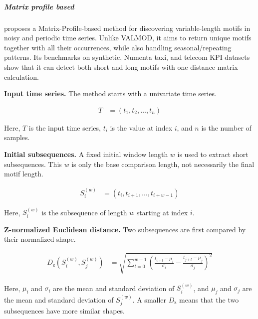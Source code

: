 \documentclass{book}
\begin{document}
\subparagraph{Matrix profile based}


\cite{vanonsem-2023-variable-length-motif-discovery-in-time-series-data} proposes a Matrix-Profile-based method for discovering variable-length motifs in noisy and periodic time series. Unlike VALMOD, it aims to return unique motifs together with all their occurrences, while also handling seasonal/repeating patterns. Its benchmarks on synthetic, Numenta taxi, and telecom KPI datasets show that it can detect both short and long motifs with one distance matrix calculation.

      \noindent
      \textbf{Input time series.}
      The method starts with a univariate time series.

      \begin{align}
         T &= (t_1,t_2,\dots,t_n)
      \end{align}

      \noindent
      Here, \(T\) is the input time series, \(t_i\) is the value at index \(i\), and \(n\) is the number of samples.

      \noindent
      \textbf{Initial subsequences.}
      A fixed initial window length \(w\) is used to extract short subsequences. This \(w\) is only the base comparison length, not necessarily the final motif length.

      \begin{align}
         S_i^{(w)} &= (t_i,t_{i+1},\dots,t_{i+w-1})
      \end{align}

      \noindent
      Here, \(S_i^{(w)}\) is the subsequence of length \(w\) starting at index \(i\).

      \noindent
      \textbf{Z-normalized Euclidean distance.}
      Two subsequences are first compared by their normalized shape.

      \begin{align}
         D_{\mathrm{z}}(S_i^{(w)},S_j^{(w)})
         &=
         \sqrt{
         \sum_{l=0}^{w-1}
         \left(
         \frac{t_{i+l}-\ensuremath{\mu}_i}{\ensuremath{\sigma}_i}
         -
         \frac{t_{j+l}-\ensuremath{\mu}_j}{\ensuremath{\sigma}_j}
         \right)^2
         }
      \end{align}

      \noindent
      Here, \(\ensuremath{\mu}_i\) and \(\ensuremath{\sigma}_i\) are the mean and standard deviation of \(S_i^{(w)}\), and \(\ensuremath{\mu}_j\) and \(\ensuremath{\sigma}_j\) are the mean and standard deviation of \(S_j^{(w)}\). A smaller \(D_{\mathrm{z}}\) means that the two subsequences have more similar shapes.
\end{document}

